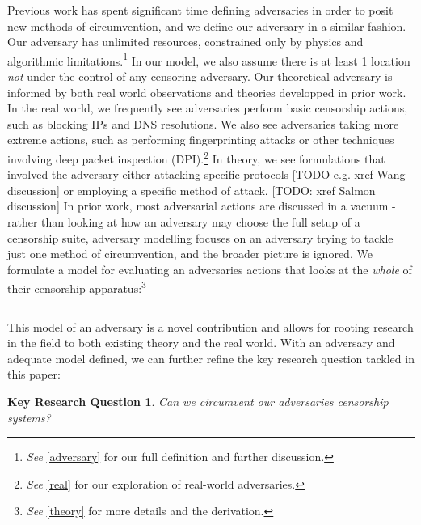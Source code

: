 \documentclass[12pt]{report}
\newtheorem*{keyq}{Key Research Question}
\begin{document}
Previous work has spent significant time defining adversaries in order to posit new methods of circumvention, and we define our adversary in a similar fashion. Our adversary has unlimited resources, constrained only by physics and algorithmic limitations.\footnote{\emph{See} \ref{adversary} for our full definition and further discussion.} In our model, we also assume there is at least 1 location \emph{not} under the control of any censoring adversary. Our theoretical adversary is informed by both real world observations and theories developped in prior work. In the real world, we frequently see adversaries perform basic censorship actions, such as blocking IPs and DNS resolutions. We also see adversaries taking more extreme actions, such as performing fingerprinting attacks or other techniques involving deep packet inspection (DPI).\footnote{\emph{See} \ref{real} for our exploration of real-world adversaries.} In theory, we see formulations that involved the adversary either attacking specific protocols [TODO e.g. xref Wang discussion] or employing a specific method of attack. [TODO: xref Salmon discussion] In prior work, most adversarial actions are discussed in a vacuum - rather than looking at how an adversary may choose the full setup of a censorship suite, adversary modelling focuses on an adversary trying to tackle just one method of circumvention, and the broader picture is ignored. We formulate a model for evaluating an adversaries actions that looks at the \emph{whole} of their censorship apparatus:\footnote{\emph{See} \ref{theory} for more details and the derivation.}

\begin{equation}
[TODO: insert the final equation after cleaning notation]
\end{equation}

This model of an adversary is a novel contribution and allows for rooting research in the field to both existing theory and the real world. With an adversary and adequate model defined, we can further refine the key research question tackled in this paper:

\begin{keyq}
Can we circumvent our adversaries censorship systems?
\end{keyq}
\end{document}
